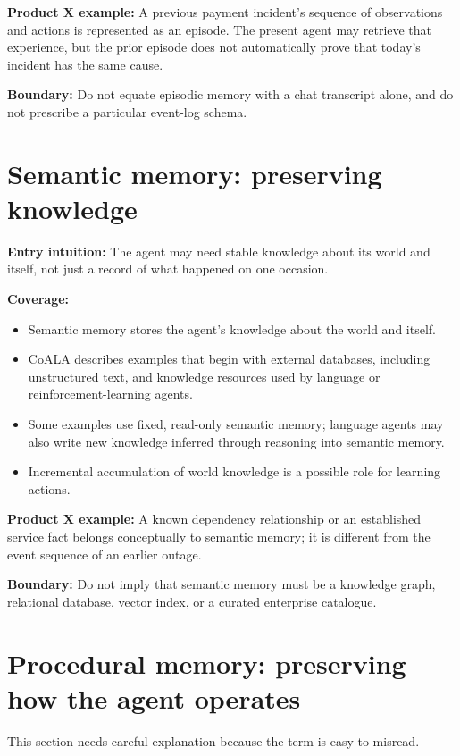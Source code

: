 \textbf{Product X example:} A previous payment incident's sequence of observations and actions is represented as an episode. The present agent may retrieve that experience, but the prior episode does not automatically prove that today's incident has the same cause.

\textbf{Boundary:} Do not equate episodic memory with a chat transcript alone, and do not prescribe a particular event-log schema.

\section{Semantic memory: preserving knowledge}
\textbf{Entry intuition:} The agent may need stable knowledge about its world and itself, not just a record of what happened on one occasion.

\textbf{Coverage:}
\begin{itemize}
  \item Semantic memory stores the agent's knowledge about the world and itself.
  \item CoALA describes examples that begin with external databases, including unstructured text, and knowledge resources used by language or reinforcement-learning agents.
  \item Some examples use fixed, read-only semantic memory; language agents may also write new knowledge inferred through reasoning into semantic memory.
  \item Incremental accumulation of world knowledge is a possible role for learning actions.
\end{itemize}

\textbf{Product X example:} A known dependency relationship or an established service fact belongs conceptually to semantic memory; it is different from the event sequence of an earlier outage.

\textbf{Boundary:} Do not imply that semantic memory must be a knowledge graph, relational database, vector index, or a curated enterprise catalogue.

\section{Procedural memory: preserving how the agent operates}
This section needs careful explanation because the term is easy to misread.

